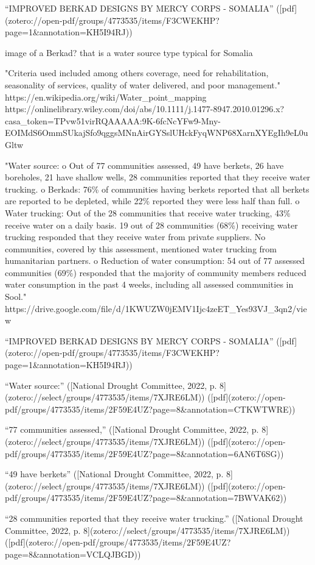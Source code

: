{{“IMPROVED BERKAD DESIGNS BY MERCY CORPS - SOMALIA” ([pdf](zotero://open-pdf/groups/4773535/items/F3CWEKHP?page=1&annotation=KH5I94RJ))

image of a Berkad? that is a water source type typical for Somalia

"Criteria used included among others coverage, need for rehabilitation, seasonality of services, quality of water delivered, and poor management." https://en.wikipedia.org/wiki/Water_point_mapping
https://onlinelibrary.wiley.com/doi/abs/10.1111/j.1477-8947.2010.01296.x?casa_token=TPvw51virRQAAAAA:9K-6fcNcYFw9-Mny-EOIMdS6OmmSUkajSfo9qggsMNnAirGYSslUHckFyqWNP68XarnXYEgIh9eL0uGltw

"Water source:
o Out of 77 communities assessed, 49 have berkets, 26 have boreholes, 21 have shallow
wells, 28 communities reported that they receive water trucking.
o Berkads: 76\% of communities having berkets reported that all berkets are reported to be
depleted, while 22\% reported they were less half than full.
o Water trucking: Out of the 28 communities that receive water trucking, 43\% receive water
on a daily basis. 19 out of 28 communities (68\%) receiving water trucking responded that
they receive water from private suppliers. No communities, covered by this assessment,
mentioned water trucking from humanitarian partners.
o Reduction of water consumption: 54 out of 77 assessed communities (69\%) responded
that the majority of community members reduced water consumption in the past 4 weeks,
including all assessed communities in Sool." https://drive.google.com/file/d/1KWUZW0jEMV1Ijc4zeET_Yes93VJ_3qn2/view

“IMPROVED BERKAD DESIGNS BY MERCY CORPS - SOMALIA” ([pdf](zotero://open-pdf/groups/4773535/items/F3CWEKHP?page=1&annotation=KH5I94RJ))

“Water source:” ([National Drought Committee, 2022, p. 8](zotero://select/groups/4773535/items/7XJRE6LM)) ([pdf](zotero://open-pdf/groups/4773535/items/2F59E4UZ?page=8&annotation=CTKWTWRE))

“77 communities assessed,” ([National Drought Committee, 2022, p. 8](zotero://select/groups/4773535/items/7XJRE6LM)) ([pdf](zotero://open-pdf/groups/4773535/items/2F59E4UZ?page=8&annotation=6AN6T6SG))

“49 have berkets” ([National Drought Committee, 2022, p. 8](zotero://select/groups/4773535/items/7XJRE6LM)) ([pdf](zotero://open-pdf/groups/4773535/items/2F59E4UZ?page=8&annotation=7BWVAK62))

“28 communities reported that they receive water trucking.” ([National Drought Committee, 2022, p. 8](zotero://select/groups/4773535/items/7XJRE6LM)) ([pdf](zotero://open-pdf/groups/4773535/items/2F59E4UZ?page=8&annotation=VCLQJBGD))

}}
